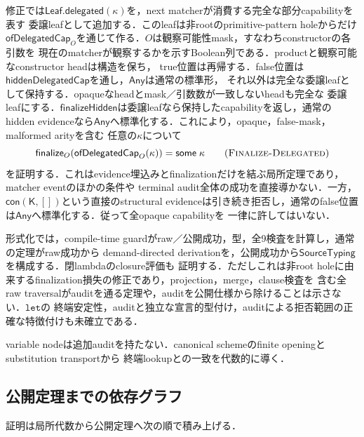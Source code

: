 修正では$\mathsf{Leaf.delegated}(\kappa)$を，next matcherが消費する完全な部分capabilityを表す
委譲leafとして追加する．このleafは非rootのprimitive-pattern holeからだけ
$\mathsf{ofDelegatedCap}_{O}$を通じて作る．$O$は観察可能性mask，すなわちconstructorの各引数を
現在のmatcherが観察するかを示すBoolean列である．productと観察可能なconstructor headは構造を保ち，
true位置は再帰する．false位置は$\mathsf{hiddenDelegatedCap}$を通し，$\mathsf{Any}$は通常の標準形，
それ以外は完全な委譲leafとして保持する．opaqueなheadとmask／引数数が一致しないheadも完全な
委譲leafにする．$\mathsf{finalizeHidden}$は委譲leafなら保持したcapabilityを返し，通常の
hidden evidenceなら$\mathsf{Any}$へ標準化する．これにより，opaque，false-mask，malformed arityを含む
任意の$\kappa$について
\[
\mathsf{finalize}_{O}(\mathsf{ofDelegatedCap}_{O}(\kappa))
=\mathsf{some}\;\kappa
\tag{\textsc{Finalize-Delegated}}
\]
を証明する．これはevidence埋込みとfinalizationだけを結ぶ局所定理であり，matcher eventのほかの条件や
terminal audit全体の成功を直接導かない．一方，$\mathsf{con}(\mathsf K,[])$という直接のstructural
evidenceは引き続き拒否し，通常のfalse位置は$\mathsf{Any}$へ標準化する．従って全opaque capabilityを
一律に許してはいない．

形式化では，compile-time guardがraw／公開成功，型，全9検査を計算し，通常の定理がraw成功から
demand-directed derivationを，公開成功から$\mathsf{SourceTyping}$を構成する．閉lambdaのclosure評価も
証明する．ただしこれは非root holeに由来するfinalization損失の修正であり，projection，merge，clause検査を
含む全raw traversalがauditを通る定理や，auditを公開仕様から除けることは示さない．$\mathtt{let}$の
終端安定性，auditと独立な宣言的型付け，auditによる拒否範囲の正確な特徴付けも未確立である．

variable nodeは追加auditを持たない．canonical schemeのfinite openingとsubstitution transportから
終端lookupとの一致を代数的に導く．

\subsection{公開定理までの依存グラフ}

証明は局所代数から公開定理へ次の順で積み上げる．

